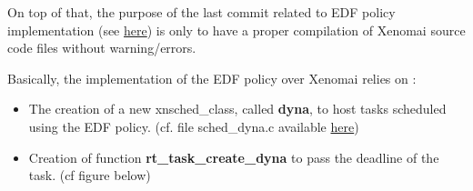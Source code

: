 \documentclass[12pt,hidelinks]{article}
\begin{document}
{    On top of that, the purpose of the last commit related to EDF policy implementation (see \href{https://github.com/skyultime/Xenomai-EDH/commit/37aed321405df633a39f17e16ad50599cadb9ed9}{here}) is only to have a proper compilation of Xenomai source code files without warning/errors.\newline

    Basically, the implementation of the EDF policy over Xenomai relies on :
    \begin{itemize}
        \item The creation of a new xnsched\_class, called \textbf{dyna}, to host tasks scheduled using the EDF policy. (cf. file sched\_dyna.c available \href{https://github.com/skyultime/Xenomai-EDH/blob/final_version/kernel/cobalt/sched-dyna.c}{here})
        \item Creation of function \textbf{rt\_task\_create\_dyna} to pass the deadline of the task. (cf figure below)



\end{itemize}}
\end{document}
